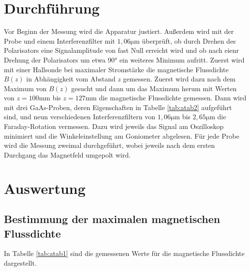 \section{Durchführung}
Vor Beginn der Messung wird die Apparatur justiert. Außerdem wird mit der Probe und einem Interferenzfilter mit 
$1,06 \si{\micro \meter}$ überprüft, ob durch Drehen des Polarisators eine Signalamplitude von fast Null erreicht wird 
und ob nach eienr Drehung der Polarisators um etwa 90° ein weiteres Minimum aufritt.
Zuerst wird mit einer Hallsonde bei maximaler Stromstärke die magnetische Flussdichte $B(z)$ in Abhängigkeit vom 
Abstand $z$ gemessen. Zuerst wird dazu nach dem Maximum von $B(z)$ gesucht und dann um das Maximum herum mit Werten 
von $z = 100 \si{\milli\meter}$ bis $z = 127 \si{\milli\meter}$ die magnetische Flussdichte gemessen.
Dann wird mit drei GaAs-Proben, deren Eigenschaften in Tabelle \ref{tab:atab2} aufgeführt sind, und neun verschiedenen 
Interferenzfiltern von $1,06 \si{\micro \meter}$ bis $2,65 \si{\micro \meter}$ die Faraday-Rotation vermessen.
Dazu wird jeweils das Signal am Oszilloskop minimiert und die Winkeleinstellung am Goniometer abgelesen. Für jede Probe 
wird die Messung zweimal durchgeführt, wobei jeweils nach dem ersten Durchgang das Magnetfeld umgepolt wird.

\section{Auswertung}
\subsection{Bestimmung der maximalen magnetischen Flussdichte}
In Tabelle \ref{tab:atab1} sind die gemessenen Werte für die magnetische Flussdichte dargestellt. 

